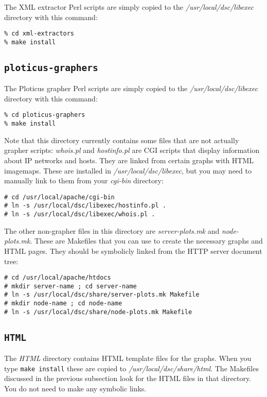 \documentclass{report}
\begin{document}
The XML extractor Perl scripts are simply copied to the
{\em /usr/local/dsc/libexec\/} directory with this command:

\begin{verbatim}
% cd xml-extractors
% make install
\end{verbatim}

\subsection{\tt ploticus-graphers}

The Ploticus grapher Perl scripts are simply copied to the
{\em /usr/local/dsc/libexec\/} directory with this command:

\begin{verbatim}
% cd ploticus-graphers
% make install
\end{verbatim}

\noindent
Note that this directory currently contains some files that are not
actually grapher scripts: {\em whois.pl\/} and {\em hostinfo.pl\/}
are CGI scripts that display information about IP networks and hosts.
They are linked from certain graphs with HTML imagemaps.  These are
installed in {\em /usr/local/dsc/libexec\/}, but you may need to manually
link to them from your {\em cgi-bin\/} directory:

\begin{verbatim}
# cd /usr/local/apache/cgi-bin
# ln -s /usr/local/dsc/libexec/hostinfo.pl .
# ln -s /usr/local/dsc/libexec/whois.pl .
\end{verbatim}

\noindent
The other non-grapher files in this directory are {\em server-plots.mk\/}
and {\em node-plots.mk\/}.  These are Makefiles that you can use to create
the necessary graphs and HTML pages.  They should be symbolicly linked
from the HTTP server document tree:

\begin{verbatim}
# cd /usr/local/apache/htdocs
# mkdir server-name ; cd server-name
# ln -s /usr/local/dsc/share/server-plots.mk Makefile
# mkdir node-name ; cd node-name
# ln -s /usr/local/dsc/share/node-plots.mk Makefile
\end{verbatim}

\subsection{\tt HTML}

The {\em HTML\/} directory contains HTML template files for the graphs.
When you type {\tt make install\/} these are copied to
{\em /usr/local/dsc/share/html\/}.  The Makefiles discussed in
the previous subsection look for the HTML files in that directory.
You do not need to make any symbolic links.
\end{document}
